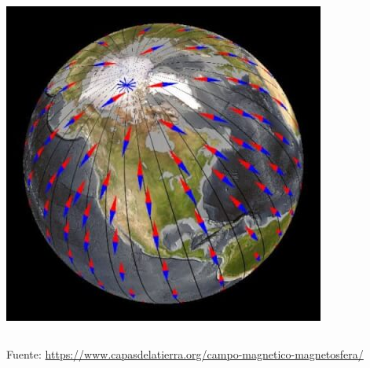 \begin{frame}
\begin{columns}
\begin{column}{0.40\textwidth}
      	\includegraphics[width=\textwidth]{05.instrumentos.giroscopicos.imagenes/05.04.MagnetismoTerrestre/05-04-polos-de-la-tierra.jpg}
	\end{column}

\end{columns}\vspace{3mm}

    {\tiny Fuente: \url{https://www.capasdelatierra.org/campo-magnetico-magnetosfera/}}

\end{frame}


